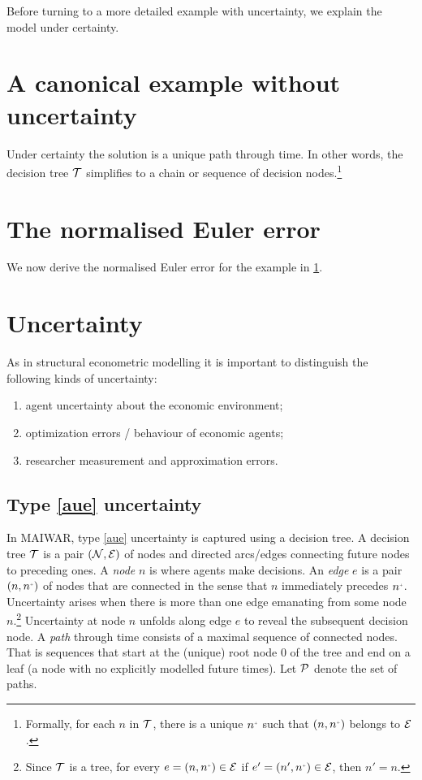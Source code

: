 \documentclass[12pt,a4paper,twoside, draft]{article}
\begin{document}
Before turning to a more detailed example with uncertainty, we explain the
model under certainty.
\section{A canonical example without uncertainty}\label{sec-certainty}
Under certainty the solution is a unique path through time.
In other words, the decision tree $\mathcal T$ simplifies to a chain or
sequence of decision nodes.\footnote{
   Formally, for each $n$ in $\mathcal T$, there is a unique $n^{\mplus}$ such that
   $(n, n^{\mplus})$ belongs to $\mathcal E$.
}

\section{The normalised Euler error}
We now derive the normalised Euler error for the example in
\cref{sec-certainty}.



\section{Uncertainty}
As in structural econometric modelling
\citep{Reiss_Wolak-Structural_econometrics} it is important to distinguish the
following kinds of uncertainty:
\begin{enumerate}[I]
   \item\label{aue} agent uncertainty about the economic environment;
   \item\label{aub} optimization errors / behaviour of economic agents;
   \item\label{rum} researcher measurement and approximation errors.
\end{enumerate}
\subsection{Type \ref{aue} uncertainty}
In MAIWAR, type \ref{aue} uncertainty is captured using a decision tree.
A decision tree $\mathcal T$ is a pair $(\mathcal N, \mathcal E)$ of nodes and directed
arcs/edges connecting future nodes to preceding ones.
A \emph{node} $n$ is where agents make decisions.
An \emph{edge} $e$ is a pair $(n, n^{\mplus})$ of nodes that are connected in
the sense that $n$ immediately precedes $n^{\mplus}$.
Uncertainty arises when there is more than one edge emanating from some node
$n$.\footnote{
   Since $\mathcal T$ is a tree, for every $e = (n , n^{\mplus}) \in \mc E$ if 
   $e' = (n', n^{\mplus}) \in \mc E$, then $n' = n$.
}
Uncertainty at node $n$ unfolds along edge $e$ to reveal the subsequent
decision node.
A \emph{path} through time consists of a maximal sequence of connected nodes.
That is sequences that start at the (unique) root node $\mathfrak{0}$ of the
tree and end on a leaf (a node with no explicitly modelled future times).
Let $\mathcal P$ denote the set of paths.
\end{document}
